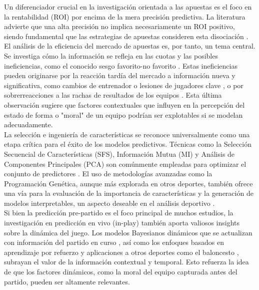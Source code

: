 Un diferenciador crucial en la investigación orientada a las apuestas es el foco en la rentabilidad (ROI) por encima de la mera precisión predictiva.
La literatura advierte que una alta precisión no implica necesariamente un ROI positivo, siendo fundamental que las estrategias de apuestas consideren esta disociación \cite{Wunderlinch2019AreBettingReturnsUseful}.
El análisis de la eficiencia del mercado de apuestas es, por tanto, un tema central. Se investiga cómo la información se refleja en las cuotas y las posibles ineficiencias, como el conocido sesgo favorito-no favorito \cite{Angelini2021InformationalEfficiency, Hegarti2024TaleOfTwoMarkets}.
Estas ineficiencias pueden originarse por la reacción tardía del mercado a información nueva y significativa, como cambios de entrenador \cite{Bernardo2018SemiStrong} o lesiones de jugadores clave \cite{Fisher2024PricingResponse}, o por sobrerreacciones a las rachas de resultados de los equipos \cite{Wheatcroft2020ProfitingOverreaction}. Esta última observación sugiere que factores contextuales que influyen en la percepción del estado de forma o "moral" de un equipo podrían ser explotables si se modelan adecuadamente. \\

La selección e ingeniería de características se reconoce universalmente como una etapa crítica para el éxito de los modelos predictivos.
Técnicas como la Selección Secuencial de Características (SFS), Información Mutua (MI) y Análisis de Componentes Principales (PCA) son comúnmente empleadas para optimizar el conjunto de predictores \cite{Tammouch2024BettingML, Rodrigues2022FootballPredictionML}.
El uso de metodologías avanzadas como la Programación Genética, aunque más explorada en otros deportes, también ofrece una vía para la evaluación de la importancia de características y la generación de modelos interpretables, un aspecto deseable en el análisis deportivo \cite{Geng2020SportsGamesGP}.\\

Si bien la predicción pre-partido es el foco principal de muchos estudios, la investigación en predicción en vivo (in-play) también aporta valiosos insights sobre la dinámica del juego.
Los modelos Bayesianos dinámicos que se actualizan con información del partido en curso \cite{Zou2020BayesianInPlay}, así como los enfoques basados en aprendizaje por refuerzo \cite{Rahimian2024InGameRL} y aplicaciones a otros deportes como el baloncesto \cite{Song2020RealTimeNBAPredictions}, subrayan el valor de la información contextual y temporal. Esto refuerza la idea de que los factores dinámicos, como la moral del equipo capturada antes del partido, pueden ser altamente relevantes. \\

